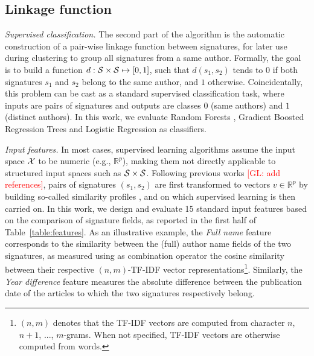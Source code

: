\documentclass{article}
\newcommand{\glnote}[1]{\textcolor{red}{[GL: #1]}}
\begin{document}

\subsection{Linkage function}
\label{methods:linkage}

\textit{Supervised classification.} The second part of the algorithm is the
automatic construction of a pair-wise linkage function between signatures, for
later use during clustering to group all signatures from a same author.
Formally, the goal is to build a function $d: {\cal S} \times {\cal S} \mapsto
[0, 1]$, such that $d(s_1, s_2)$ tends to $0$ if both signatures $s_1$ and
$s_2$ belong to the same author, and $1$ otherwise. Coincidentally, this
problem can be cast as a standard supervised classification task, where inputs
are pairs of signatures and outputs are classes $0$ (same authors) and $1$
(distinct authors). In this work, we evaluate Random Forests \citep{breiman2001random},
Gradient Boosted Regression Trees \citep{friedman2001greedy} and Logistic Regression \citep{fan2008liblinear} as classifiers.

\textit{Input features.} In most cases, supervised learning algorithms assume
the input space ${\cal X}$ to be numeric (e.g., $\mathbb{R}^p$), making them
not directly applicable to structured input spaces such as ${\cal S} \times
{\cal S}$. Following previous works \glnote{add references}, pairs of
signatures $(s_1, s_2)$ are first transformed to vectors $v \in \mathbb{R}^p$
by building so-called similarity profiles
\citep{treeratpituk2009disambiguating}, and on which supervised learning is
then carried on. In this work, we design and evaluate 15 standard input
features based on the comparison of signature fields, as reported in the first
half of Table~\ref{table:features}. As an illustrative example, the
\textit{Full name} feature corresponds to the similarity between the (full)
author name fields of the two signatures, as measured using as combination
operator the cosine similarity between their respective $(n,m)$-TF-IDF vector
representations\footnote{$(n,m)$ denotes that the TF-IDF vectors are computed
from character $n$, $n+1$, ..., $m$-grams. When not specified, TF-IDF vectors
are otherwise computed from words.}. Similarly, the \textit{Year difference}
feature measures the absolute difference between the publication date of the
articles to which the two signatures respectively belong.
\end{document}
